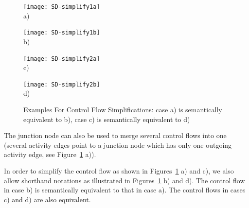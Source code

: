 \begin{figure}[htb]
	\centering
  \begin{minipage}[t]{.24\textwidth}
    \centering
    \texttt{[image: SD-simplify1a]} 
    \\a)
  \end{minipage}%
  \hfill
  \begin{minipage}[t]{.24\textwidth}
    \centering
    \texttt{[image: SD-simplify1b]}
    \\b)
  \end{minipage}
  \hfill
  \begin{minipage}[t]{.24\textwidth}
    \centering
    \texttt{[image: SD-simplify2a]}
    \\c)
  \end{minipage}
  \hfill
  \begin{minipage}[t]{.24\textwidth}
    \centering
    \texttt{[image: SD-simplify2b]}
    \\d)
  \end{minipage}
  \caption[Examples For Control Flow Simplifications]{Examples For Control Flow Simplifications: case a) is semantically equivalent to b), case c) is semantically equivalent to d)}
  \label{fig:SD-simplifications}
\end{figure}

The junction node can also be used to merge several control flows into one
(several activity edges point to a junction node which has only one outgoing activity edge,
see Figure~\ref{fig:SD-simplifications} a)).

In order to simplify the control flow as shown in Figures~\ref{fig:SD-simplifications} a) and c),
we also allow shorthand notations as illustrated in Figures~\ref{fig:SD-simplifications} b) and d).
The control flow in case b) is semantically equivalent to that in case a).
The control flows in cases c) and d) are also equivalent.

